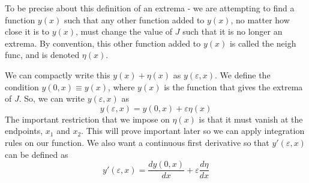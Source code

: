 \documentclass[12pt]{report}
\begin{document}
To be precise about this definition of an extrema - we are attempting to find a function $y(x)$ such that any other function added to $y(x)$, no matter how close it is to $y(x)$, must change the value of $J$ such that it is no longer an extrema. By convention, this other function added to $y(x)$ is called the \gls{neigh func}, and is denoted $\eta(x)$.

We can compactly write this $y(x)+\eta(x)$ as $y(\varepsilon,x)$. We define the condition $y(0,x)\equiv y(x)$, where $y(x)$ is the function that gives the extrema of $J$. So, we can write $y(\varepsilon,x)$ as
\begin{equation}\label{eq:y epsilon}
    y(\varepsilon,x)=y(0,x)+\varepsilon\eta(x)
\end{equation}
The important restriction that we impose on $\eta(x)$ is that it must vanish at the endpoints, $x_1$ and $x_2$. This will prove important later so we can apply integration rules on our function. We also want a continuous first derivative so that $y'(\varepsilon,x)$ can be defined as
\begin{equation}\label{eq:y prime epsilon}
    y'(\varepsilon,x)=\frac{dy(0,x)}{dx}+\varepsilon\frac{d\eta}{dx}
\end{equation}
\end{document}
